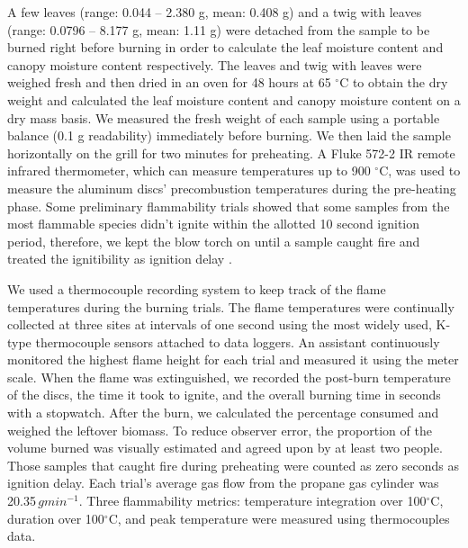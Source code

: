 \documentclass{ttuthes2007}
\begin{document}
\noindent A few leaves (range: 0.044 -- 2.380 g, mean: 0.408 g) and a twig with leaves (range: 0.0796 -- 8.177 g, mean: 1.11 g) were detached from the sample to be burned right before burning in order to calculate the leaf moisture content and canopy moisture content respectively. The leaves and twig with leaves were weighed fresh and then dried in an oven for 48 hours at 65 $^{\circ}$C to obtain the dry weight and calculated the leaf moisture content and canopy moisture content on a dry mass basis.
We measured the fresh weight of each sample using a portable balance (0.1 g readability) immediately before burning. %
We then laid the sample horizontally on the grill for two minutes for preheating. A Fluke 572-2 IR remote infrared thermometer, which can measure temperatures up to 900 $^{\circ}$C, was used to measure the aluminum discs' precombustion temperatures during the pre-heating phase. Some preliminary flammability trials %
showed that some samples from the most flammable species didn't ignite within the allotted 10 second ignition period, therefore, we kept the blow torch on until a sample caught fire and treated the ignitibility as ignition delay \citep{anderson1970forest}.  

\noindent We used a thermocouple recording system to keep track of the flame temperatures during the burning trials. The flame temperatures were continually collected at three sites at intervals of one second using the most widely used, K-type thermocouple sensors \citep{mcgranahan2020inconvenient} attached to data loggers. %
An assistant continuously monitored the highest flame height for each trial and measured it using the meter scale. When the flame was extinguished, we recorded the post-burn temperature of the discs, the time it took to ignite, and the overall burning time in seconds with a stopwatch. After the burn, we calculated the percentage consumed and weighed the leftover biomass. To reduce observer error, the proportion of the volume burned was visually estimated and agreed upon by at least two people. Those samples that caught fire during preheating were counted as zero seconds as ignition delay. Each trial's average gas flow from the propane gas cylinder was 20.35\,$g min^{-1}$. Three flammability metrics: temperature integration over 100$^{\circ}$C, duration over 100$^{\circ}$C, and peak temperature were measured using thermocouples data.
\end{document}
